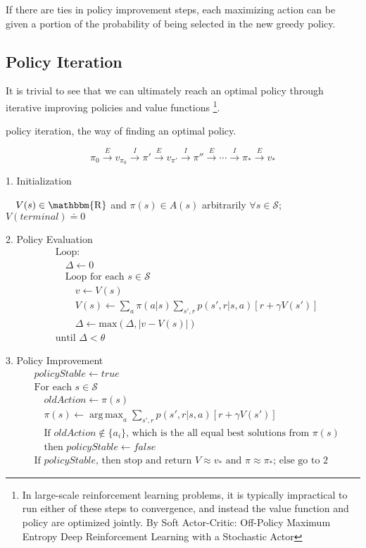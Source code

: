 \documentclass[lang=en,mode=geye,device=normal,color=blue,14pt]{elegantnote}
\DeclareMathOperator*{\1}{\mathbbm{1}}
\DeclareMathOperator*{\R}{\mathbbm{R}}
\DeclareMathOperator*{\argmax}{arg\,max}
\begin{document}
If there are ties in policy improvement steps, each maximizing action can be given a portion of the probability of being selected in the new greedy policy.

\subsection{Policy Iteration}

It is trivial to see that we can ultimately reach an optimal policy through iterative improving policies and value functions \footnote{In large-scale reinforcement learning problems, it is typically impractical to run either of these steps to convergence, and instead the value function and policy are optimized jointly. By Soft Actor-Critic: Off-Policy Maximum Entropy Deep Reinforcement Learning with a Stochastic Actor}.

\begin{definition}
policy iteration, the way of finding an optimal policy.

$$\pi_0 \xrightarrow{E} v_{\pi_0} \xrightarrow{I} \pi' \xrightarrow{E} v_{\pi'} \xrightarrow{I} \pi'' \xrightarrow{E} \cdots \xrightarrow{I} \pi_* \xrightarrow{E} v_* $$
\end{definition}

\begin{tcolorbox}[width=\textwidth,title={Policy Iteration (using iterative policy evaluation) for estimating $\pi \approx \pi_*$}]
1. Initialization

$\quad V(s) \in\R$ and $\pi(s) \in A(s)$ arbitrarily $\forall s \in \mathcal{S}$; $V(terminal) \doteq 0$

2. Policy Evaluation
\begin{align*}
&\text{Loop:}\\
&\quad\Delta \leftarrow 0\\
&\quad\text{Loop for each } s \in \mathcal{S}\\
&\quad\quad v \leftarrow V(s)\\
&\quad\quad V(s) \leftarrow \sum_a \pi (a|s) \sum_{s',r} p(s',r|s,a)[r + \gamma V(s')]\\
&\quad\quad \Delta \leftarrow \text{max}(\Delta, |v-V(s)|)\\
&\text{until } \Delta < \theta
\end{align*}

3. Policy Improvement
\begin{align*}
&policyStable \leftarrow true\\
&\text{For each } s \in \mathcal{S}\\
&\quad oldAction \leftarrow \pi(s)\\
&\quad \pi(s) \leftarrow \argmax_a \sum_{s',r} p(s',r|s,a)[r+\gamma V(s')]\\
&\quad \text{If } oldAction \notin \{a_i\} \text{, which is the all equal best solutions from $\pi(s)$}\\
& \quad \text{then } policyStable \leftarrow false\\
&\text{If } policyStable \text{, then stop and return } V \approx v_* \text{ and } \pi \approx \pi_*\text{; else go to 2}	
\end{align*}
\end{tcolorbox}
\end{document}
